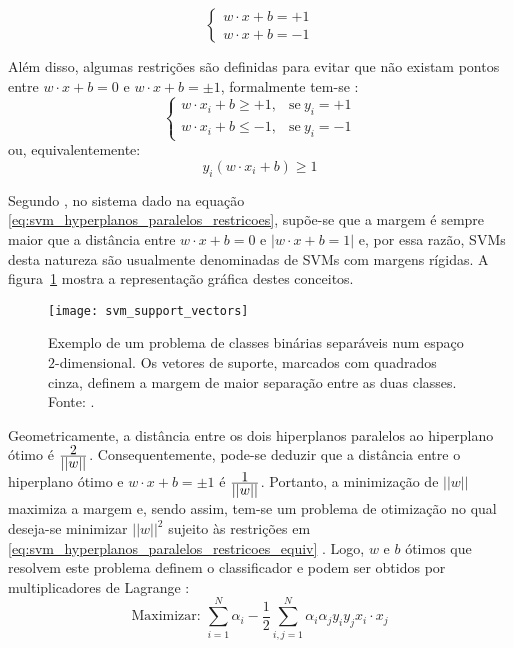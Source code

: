 \begin{equation}
\label{eq:svm_hyperplanos_paralelos}
\begin{cases}
    w \cdot x + b = +1\\
    w \cdot x + b = -1
\end{cases}
\end{equation}

Além disso, algumas restrições são definidas para evitar que não existam pontos entre $w \cdot x + b = 0$ e $w \cdot x + b = \pm 1$, formalmente tem-se \citep{lorena:03}:
\begin{equation}
\label{eq:svm_hyperplanos_paralelos_restricoes}
\begin{cases}
    w \cdot x_i + b \geq +1, & \text{se}\ y_i = +1\\
    w \cdot x_i + b \leq -1, & \text{se}\ y_i = -1
\end{cases}
\end{equation}
\noindent ou, equivalentemente:
\begin{equation}
\label{eq:svm_hyperplanos_paralelos_restricoes_equiv}
    y_i (w \cdot x_i + b) \geq 1
\end{equation}

Segundo \citet{campbell:00}, no sistema dado na equação \ref{eq:svm_hyperplanos_paralelos_restricoes}, supõe-se que a margem é sempre maior que a distância entre $w \cdot x + b = 0$ e $|w \cdot x + b = 1|$ e, por essa razão, SVMs desta natureza são usualmente denominadas de SVMs com margens rígidas. A figura~\ref{fig:svm_support_vectors} mostra a representação gráfica destes conceitos.

\begin{figure}[!h]
  \centering
  \texttt{[image: svm\_support\_vectors]}
  \caption[Exemplo de um problema de classes binárias separáveis num espaço $2$-dimensional]{Exemplo de um problema de classes binárias separáveis num espaço $2$-dimensional. Os vetores de suporte, marcados com quadrados cinza, definem a margem de maior separação entre as duas classes. Fonte: \citet{cortes:95}.}
  \label{fig:svm_support_vectors}
\end{figure}

Geometricamente, a distância entre os dois hiperplanos paralelos ao hiperplano ótimo é $\frac{\displaystyle 2}{\displaystyle ||w||}$. Consequentemente, pode-se deduzir que a distância entre o hiperplano ótimo e $w \cdot x + b = \pm 1$ é $\frac{\displaystyle 1}{\displaystyle ||w||}$. Portanto, a minimização de $||w||$ maximiza a margem e, sendo assim, tem-se um problema de otimização no qual deseja-se minimizar $||w||^2$ sujeito às restrições em \ref{eq:svm_hyperplanos_paralelos_restricoes_equiv} \citep{lorena:03}. Logo, $w$ e $b$ ótimos que resolvem este problema definem o classificador e podem ser obtidos por multiplicadores de Lagrange \citep{campbell:00}:
\begin{equation}
\label{eq:svm_margens_rigidas}
\text{Maximizar: } \sum_{i=1}^N \alpha_i - \frac{1}{2} \sum_{i, j=1}^N \alpha_i \alpha_j y_i y_j x_i\cdot x_j
\end{equation}

